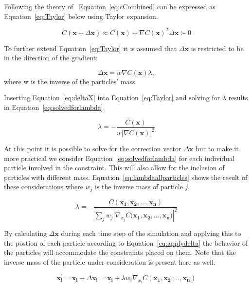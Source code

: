 Following the theory of~\cite{macklin2013position} Equation~\ref{eq:cCombined}
can be expressed as Equation~\ref{eq:Taylor} below using Taylor expansion.

\begin{equation}
\label{eq:Taylor}
C(\mathbf{x} + \Delta \mathbf{x}) \approx C(\mathbf{x}) + \nabla C(\mathbf{x})^{T} \Delta \mathbf{x} \succ 0
\end{equation}

To further extend Equation~\ref{eq:Taylor} it is assumed that $ \Delta
\mathbf{x} $ is restricted to be in the direction of the gradient:

\begin{equation}
\label{eq:deltaX}
\Delta \mathbf{x} = w \nabla C(\mathbf{x}) \lambda,
\end{equation}
 where w is the inverse of the particles' mass.

Inserting Equation~\ref{eq:deltaX} into Equation~\ref{eq:Taylor} and solving for $ \lambda $ results in Equation~\ref{eq:solvedforlambda}.

\begin{equation}
\label{eq:solvedforlambda}
\lambda = - \frac{C(\mathbf{x})}{w \left | \nabla C(\mathbf{x}) \right |^2}
\end{equation}

At this point it is possible to solve for the correction vector $ \Delta
\mathbf{x} $ but to make it more practical we consider
Equation~\ref{eq:solvedforlambda} for each individual particle involved in the
constraint. This will also allow for the inclusion of particles with different
mass. Equation~\ref{eq:lambdaallparticles} shows the result of these
considerations where $ w_{j} $ is the inverse mass of particle $ j $.

\begin{equation}
\label{eq:lambdaallparticles}
\lambda = - \frac{C(\mathbf{x_{1}}, \mathbf{x_{2}}, ..., \mathbf{x_{n}})}{\sum_{j} w_{j} \left | \nabla_{x_{j}} C(\mathbf{x_{1}, \mathbf{x_{2}}, ..., \mathbf{x_{n}})} \right |^2}
\end{equation}

By calculating $ \Delta \mathbf{x} $ during each time step of the simulation
and applying this to the postion of each particle according to
Equation~\ref{eq:applydelta} the behavior of the particles will accommodate the
constraints placed on them. Note that the inverse mass of the particle under
consideration is present here as well.

\begin{equation}
\label{eq:applydelta}
\mathbf{x_{i}^{'}} = \mathbf{x_{i}} + \Delta \mathbf{x_{i}} = \mathbf{x_{i}} + \lambda w_{i} \nabla_{x_{i}} C(\mathbf{x_{1}}, \mathbf{x_{2}}, ..., \mathbf{x_{n}})
\end{equation}

